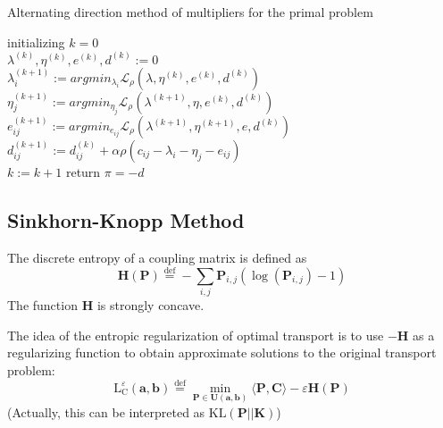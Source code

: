 \documentclass{article}
\begin{document}
\begin{algorithm}[H]
  \SetAlgoNoLine
  \caption{Alternating direction method of multipliers for the primal problem} 
  initializing $k = 0$\\
  $\lambda^{(k)},\eta^{(k)},e^{(k)},d^{(k)}:=0$\\
  {  
   $\lambda^{(k+1)}_{i}:=argmin_{\lambda_{i}}\mathcal{L}_{\rho}(\lambda,\eta^{(k)},e^{(k)},d^{(k)})$\\
   $\eta^{(k+1)}_{j}:=argmin_{\eta_{j}}\mathcal{L}_{\rho}(\lambda^{(k+1)},\eta,e^{(k)},d^{(k)})$\\
   $e^{(k+1)}_{ij}:=argmin_{e_{ij}}\mathcal{L}_{\rho}(\lambda^{(k+1)},\eta^{(k+1)},e,d^{(k)})$\\
   $d^{(k+1)}_{ij}:=d^{(k)}_{ij}+\alpha\rho(c_{ij}-\lambda_{i}-\eta_{j}-e_{ij})$\\
   $k:= k+1$
  }
  return $\pi=-d$
\end{algorithm}
\subsection{Sinkhorn-Knopp Method}
The discrete entropy of a coupling matrix is defined as
\begin{equation}
\mathbf { H } ( \mathbf { P } ) \stackrel { \mathrm { def } } { = } - \sum _ { i , j } \mathbf { P } _ { i , j } \left( \log \left( \mathbf { P } _ { i , j } \right) - 1 \right)
\end{equation}
The function $\mathbf{H}$ is strongly concave.

The idea of the entropic regularization of optimal transport is to use $-\mathbf{H}$ as a regularizing function to obtain approximate solutions to the original transport problem:
\begin{equation}
\mathrm { L } _ { \mathrm { C } } ^ { \varepsilon } ( \mathbf { a } , \mathbf { b } ) \stackrel { \mathrm { def } } { = } \min _ { \mathbf { P } \in \mathbf { U } ( \mathbf { a } , \mathbf { b } ) } \langle \mathbf { P } , \mathbf { C } \rangle - \varepsilon \mathbf { H } ( \mathbf { P } )
\label{sinkhorn target}
\end{equation}
(Actually, this can be interpreted as $\text{KL}(\mathbf{P}||\mathbf{K})$)
\end{document}
